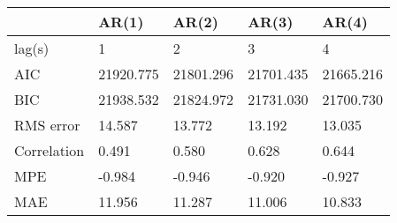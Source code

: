 \begin{tabular}{lllll}
\toprule
{} &      AR(1) &      AR(2) &      AR(3) &      AR(4) \\
\midrule
lag(s)      &          1 &          2 &          3 &          4 \\
AIC         &  21920.775 &  21801.296 &  21701.435 &  21665.216 \\
BIC         &  21938.532 &  21824.972 &  21731.030 &  21700.730 \\
RMS error   &     14.587 &     13.772 &     13.192 &     13.035 \\
Correlation &      0.491 &      0.580 &      0.628 &      0.644 \\
MPE         &     -0.984 &     -0.946 &     -0.920 &     -0.927 \\
MAE         &     11.956 &     11.287 &     11.006 &     10.833 \\
\bottomrule
\end{tabular}
